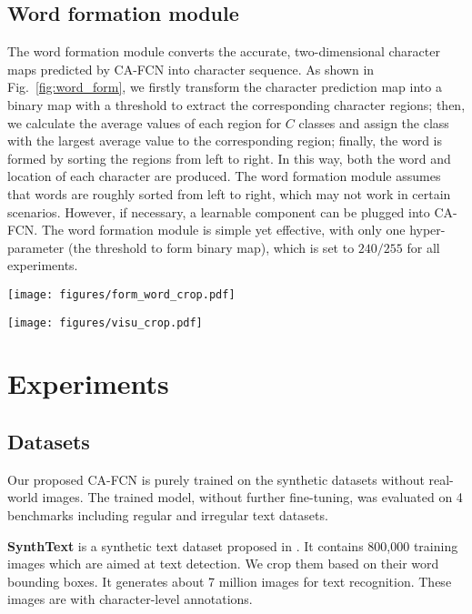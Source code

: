\documentclass[letterpaper]{article} \usepackage{aaai19}  \usepackage{times}  \usepackage{helvet}  \usepackage{courier}  \usepackage{url}  \usepackage{graphicx}  \frenchspacing  \usepackage{multirow}
\begin{document}
\subsection{Word formation module}
The word formation module converts the accurate, two-dimensional character maps predicted by CA-FCN into character sequence. As shown in Fig.~\ref{fig:word_form}, we firstly transform the character prediction map into a binary map with a threshold to extract the corresponding character regions; then, we calculate the average values of each region for $C$ classes and assign the class with the largest average value to the corresponding region; finally, the word is formed by sorting the regions from left to right. In this way, both the word and location of each character are produced. The word formation module assumes that words are roughly sorted from left to right, which may not work in certain scenarios. However, if necessary, a learnable component can be plugged into CA-FCN. The word formation module is simple yet effective, with only one hyper-parameter (the threshold to form binary map), which is set to $240/255$ for all experiments.

\begin{figure*}[ht]
\centering
\texttt{[image: figures/form\_word\_crop.pdf]}
\caption{Illustration of the word formation module.}
\label{fig:word_form}
\end{figure*}

\begin{figure*}[ht]
\centering
\texttt{[image: figures/visu\_crop.pdf]}
\caption{Visualization of character prediction maps on IIIT and CUTE. The character prediction map generated by the CA-FCN is visualized with colors.}
\label{fig:visu}
\end{figure*}

\section{Experiments}
\subsection{Datasets}
Our proposed CA-FCN is purely trained on the synthetic datasets without real-world images. The trained model, without further fine-tuning,  was evaluated on 4 benchmarks including regular and irregular text datasets.

\textbf{SynthText} is a synthetic text dataset proposed in \cite{gupta2016synthetic}. It contains 800,000 training images which are aimed at text detection. We crop them based on their word bounding boxes. It generates about 7 million images for text recognition. These images are with character-level annotations.
\end{document}
